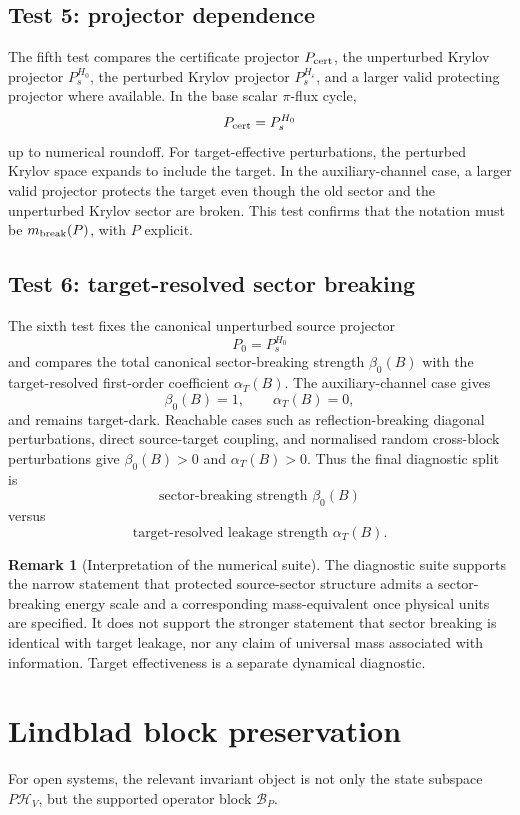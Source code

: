 \documentclass[11pt]{article}
\theoremstyle{definition}
\newtheorem{remark}[theorem]{Remark}
\newcommand{\cH}{\mathcal H}
\begin{document}
\subsection{Test 5: projector dependence}
The fifth test compares the certificate projector $P_{\rm cert}$, the unperturbed Krylov projector $P_s^{H_0}$, the perturbed Krylov projector $P_s^{H_\varepsilon}$, and a larger valid protecting projector where available. In the base scalar $\pi$-flux cycle,
\[
P_{\rm cert}=P_s^{H_0}
\]
up to numerical roundoff. For target-effective perturbations, the perturbed Krylov space expands to include the target. In the auxiliary-channel case, a larger valid projector protects the target even though the old sector and the unperturbed Krylov sector are broken. This test confirms that the notation must be $m_{\rm break}(P)$, with $P$ explicit.

\subsection{Test 6: target-resolved sector breaking}
The sixth test fixes the canonical unperturbed source projector
\[
P_0=P_s^{H_0}
\]
and compares the total canonical sector-breaking strength $\beta_0(B)$ with the target-resolved first-order coefficient $\alpha_T(B)$. The auxiliary-channel case gives
\[
\beta_0(B)=1,
\qquad \alpha_T(B)=0,
\]
and remains target-dark. Reachable cases such as reflection-breaking diagonal perturbations, direct source-target coupling, and normalised random cross-block perturbations give $\beta_0(B)>0$ and $\alpha_T(B)>0$. Thus the final diagnostic split is
\[
\text{sector-breaking strength }\beta_0(B)
\]
versus
\[
\text{target-resolved leakage strength }\alpha_T(B).
\]

\begin{remark}[Interpretation of the numerical suite]
The diagnostic suite supports the narrow statement that protected source-sector structure admits a sector-breaking energy scale and a corresponding mass-equivalent once physical units are specified. It does not support the stronger statement that sector breaking is identical with target leakage, nor any claim of universal mass associated with information. Target effectiveness is a separate dynamical diagnostic.
\end{remark}

\section{Lindblad block preservation}
For open systems, the relevant invariant object is not only the state subspace $P\cH_V$, but the supported operator block $\mathcal B_P$.
\end{document}
